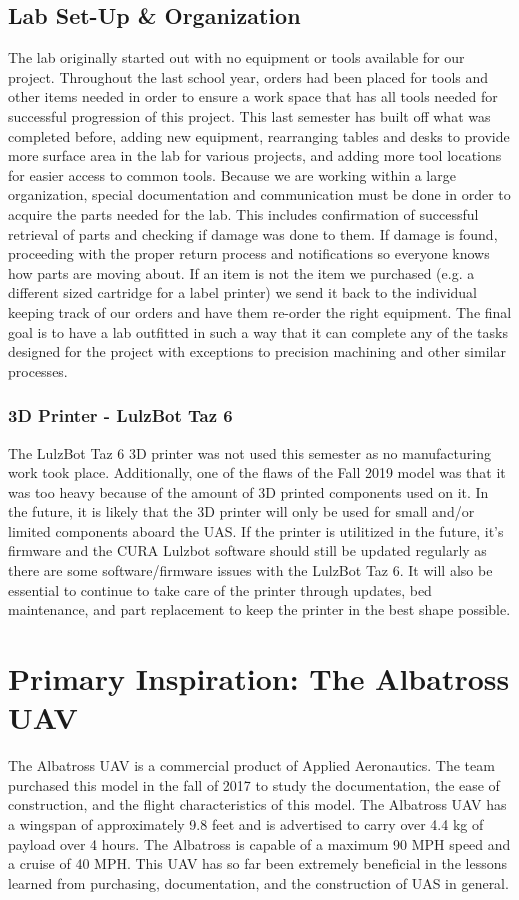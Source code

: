 \documentclass{article}
\begin{document}
\subsection{Lab Set-Up \& Organization}
\noindent The lab originally started out with no equipment or tools available for our project. Throughout the last school year, orders had been placed for tools and other items needed in order to ensure a work space that has all tools needed for successful progression of this project. This last semester has built off what was completed before, adding new equipment, rearranging tables and desks to provide more surface area in the lab for various projects, and adding more tool locations for easier access to common tools.  Because we are working within a large organization, special documentation and communication must be done in order to acquire the parts needed for the lab. This includes confirmation of successful retrieval of parts and checking if damage was done to them. If damage is found, proceeding with the proper return process and notifications so everyone knows how parts are moving about. If an item is not the item we purchased (e.g. a different sized cartridge for a label printer) we send it back to the individual keeping track of our orders and have them re-order the right equipment. The final goal is to have a lab outfitted in such a way that it can complete any of the tasks designed for the project with exceptions to precision machining and other similar processes.\\


\subsubsection{3D Printer - LulzBot Taz 6}
The LulzBot Taz 6 3D printer was not used this semester as no manufacturing work took place. Additionally, one of the flaws of the Fall 2019 model was that it was too heavy because of the amount of 3D printed components used on it. In the future, it is likely that the 3D printer will only be used for small and/or limited components aboard the UAS. If the printer is utilitized in the future, it's firmware and the CURA Lulzbot software should still be updated regularly as there are some software/firmware issues with the LulzBot Taz 6. It will also be essential to continue to take care of the printer through updates, bed maintenance, and part replacement to keep the printer in the best shape possible. 

\section{Primary Inspiration: The Albatross UAV}
\noindent The Albatross UAV is a commercial product of Applied Aeronautics. The team purchased this model in the fall of 2017 to study the documentation, the ease of construction, and the flight characteristics of this model. The Albatross UAV has a wingspan of approximately 9.8 feet and is advertised to carry over 4.4 kg of payload over 4 hours. The Albatross is capable of a maximum 90 MPH speed and a cruise of 40 MPH. This UAV has so far been extremely beneficial in the lessons learned from purchasing, documentation, and the construction of UAS in general. 
\end{document}

